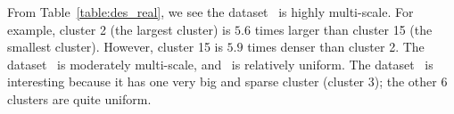 From Table~\ref{table:des_real}, we see the dataset \coil\ is highly multi-scale. 
For example, cluster 2 (the largest cluster) is $5.6$ times larger than cluster 15 (the smallest cluster).
However, cluster 15 is $5.9$ times denser than cluster 2.
The dataset \glass\ is moderately multi-scale, and \yale\ is relatively 
uniform.
The dataset \seg\ is interesting because it has one very big and sparse cluster
(cluster 3); the other 6 clusters are quite uniform.

